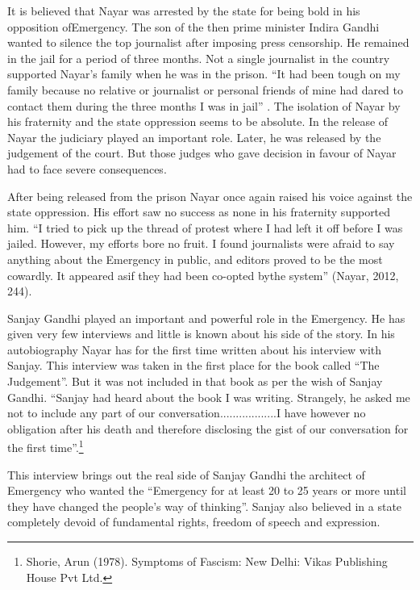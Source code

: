 \begin{multicols}{2}
\noi
It is believed that Nayar was arrested by the state for being bold in his opposition ofEmergency.
The son of the then prime minister Indira Gandhi wanted to silence the top journalist after
imposing press censorship. He remained in the jail for a period of three months. Not a single
journalist in the country supported Nayar’s family when he was in the prison. “It had been
tough on my family because no relative or journalist or personal friends of mine had dared to contact them during the three months I was in jail” . The isolation of Nayar by his fraternity
and the state oppression seems to be absolute. In the release of Nayar the judiciary played an
important role. Later, he was released by the judgement of the court. But those judges who
gave decision in favour of Nayar had to face severe consequences.

\noi
After being released from the prison Nayar once again raised his voice against the state
oppression. His effort saw no success as none in his fraternity supported him. “I tried to pick
up the thread of protest where I had left it off before I was jailed. However, my efforts bore no
fruit. I found journalists were afraid to say anything about the Emergency in public, and editors
proved to be the most cowardly. It appeared asif they had been co-opted bythe system” (Nayar,
2012, 244).

\noi
Sanjay Gandhi played an important and powerful role in the Emergency. He has given very
few interviews and little is known about his side of the story. In his autobiography Nayar has
for the first time written about his interview with Sanjay. This interview was taken in the first
place for the book called “The Judgement”. But it was not included in that book as per the wish
of Sanjay Gandhi. “Sanjay had heard about the book I was writing. Strangely, he asked me not
to include any part of our conversation..................I have however no obligation after his death
and therefore disclosing the gist of our conversation for the first time”.\footnote{Shorie, Arun (1978). Symptoms of Fascism: New Delhi: Vikas Publishing House Pvt Ltd.}

\noi
This interview brings out the real side of Sanjay Gandhi the architect of Emergency who
wanted the “Emergency for at least 20 to 25 years or more until they have changed the people’s
way of thinking”. Sanjay also believed in a state completely devoid of fundamental rights,
freedom of speech and expression.


\end{multicols}
